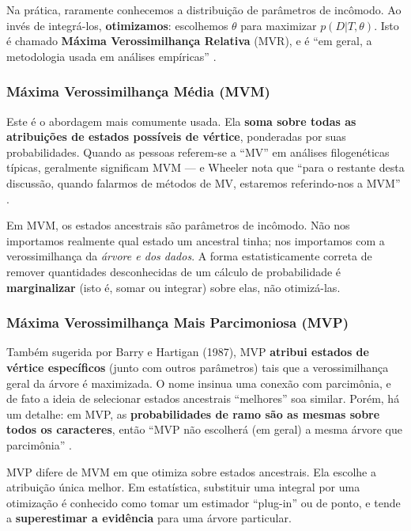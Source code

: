 Na prática, raramente conhecemos a distribuição de parâmetros de incômodo. Ao invés de integrá-los, \textbf{otimizamos}: escolhemos $\theta$ para maximizar $p(D|T, \theta)$. Isto é chamado \textbf{Máxima Verossimilhança Relativa} (MVR), e é ``em geral, a metodologia usada em análises empíricas'' \parencite{wheeler2012}.

\subsubsection{Máxima Verossimilhança Média (MVM)}

Este é o abordagem mais comumente usada. Ela \textbf{soma sobre todas as atribuições de estados possíveis de vértice}, ponderadas por suas probabilidades. Quando as pessoas referem-se a ``MV'' em análises filogenéticas típicas, geralmente significam MVM --- e Wheeler nota que ``para o restante desta discussão, quando falarmos de métodos de MV, estaremos referindo-nos a MVM'' \parencite{wheeler2012}.

Em MVM, os estados ancestrais são parâmetros de incômodo. Não nos importamos realmente qual estado um ancestral tinha; nos importamos com a verossimilhança da \textit{árvore e dos dados}. A forma estatisticamente correta de remover quantidades desconhecidas de um cálculo de probabilidade é \textbf{marginalizar} (isto é, somar ou integrar) sobre elas, não otimizá-las.

\subsubsection{Máxima Verossimilhança Mais Parcimoniosa (MVP)}

Também sugerida por Barry e Hartigan (1987), MVP \textbf{atribui estados de vértice específicos} (junto com outros parâmetros) tais que a verossimilhança geral da árvore é maximizada. O nome insinua uma conexão com parcimônia, e de fato a ideia de selecionar estados ancestrais ``melhores'' soa similar. Porém, há um detalhe: em MVP, as \textbf{probabilidades de ramo são as mesmas sobre todos os caracteres}, então ``MVP não escolherá (em geral) a mesma árvore que parcimônia'' \parencite{wheeler2012}.

MVP difere de MVM em que otimiza sobre estados ancestrais. Ela escolhe a atribuição única melhor. Em estatística, substituir uma integral por uma otimização é conhecido como tomar um estimador ``plug-in'' ou de ponto, e tende a \textbf{superestimar a evidência} para uma árvore particular.

